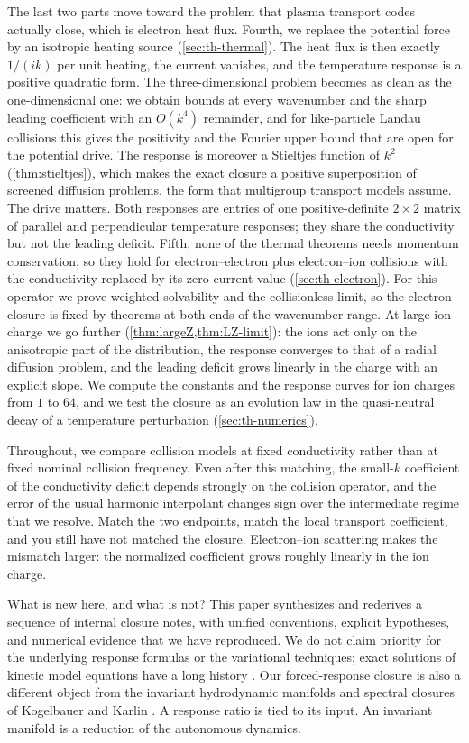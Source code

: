 \documentclass[11pt]{article}
\theoremstyle{definition}
\theoremstyle{remark}
\numberwithin{equation}{section}
\begin{document}
The last two parts move toward the problem that plasma transport codes
actually close, which is electron heat flux. Fourth, we replace the
potential force by an isotropic heating source (\cref{sec:th-thermal}).
The heat flux is then exactly $1/(ik)$ per unit heating, the current
vanishes, and the temperature response is a positive quadratic form. The
three-dimensional problem becomes as clean as the one-dimensional one:
we obtain bounds at every wavenumber and the sharp leading coefficient
with an $O(k^4)$ remainder, and for like-particle Landau collisions this
gives the positivity and the Fourier upper bound that are open for the
potential drive. The response is moreover a Stieltjes function of $k^2$
(\cref{thm:stieltjes}), which makes the exact closure a positive
superposition of screened diffusion problems, the form that multigroup
transport models assume. The drive
matters. Both responses are entries of one positive-definite $2\times2$
matrix of parallel and perpendicular temperature responses; they share
the conductivity but not the leading deficit. Fifth, none of the thermal
theorems needs momentum conservation, so they hold for electron--electron
plus electron--ion collisions with the conductivity replaced by its
zero-current value (\cref{sec:th-electron}). For this operator we prove
weighted solvability and the collisionless limit, so the electron closure
is fixed by theorems at both ends of the wavenumber range. At large ion
charge we go further (\cref{thm:largeZ,thm:LZ-limit}): the ions act only
on the anisotropic part of the distribution, the response converges to
that of a radial diffusion problem, and the leading deficit grows
linearly in the charge with an explicit slope. We compute the constants
and the response curves for ion charges from $1$ to $64$, and we test the
closure as an evolution law in the quasi-neutral decay of a temperature
perturbation (\cref{sec:th-numerics}).

Throughout, we compare collision models at fixed conductivity rather than
at fixed nominal collision frequency. Even after this matching, the
small-$k$ coefficient of the conductivity deficit depends strongly on the
collision operator, and the error of the usual harmonic interpolant
changes sign over the intermediate regime that we resolve. Match the two
endpoints, match the local transport coefficient, and you still have not
matched the closure. Electron--ion scattering makes the mismatch larger:
the normalized coefficient grows roughly linearly in the ion charge.

What is new here, and what is not? This paper synthesizes and rederives
a sequence of internal closure notes, with unified conventions, explicit
hypotheses, and numerical evidence that we have reproduced. We do not
claim priority for the underlying response formulas or the variational
techniques; exact solutions of kinetic model equations have a long
history \cite{BGK1954,Dougherty1964,Struchtrup1997}. Our forced-response
closure is also a different object from the invariant
hydrodynamic manifolds and spectral closures of Kogelbauer and Karlin
\cite{KogelbauerKarlin2024,KogelbauerKarlin2025}. A response ratio is
tied to its input. An invariant manifold is a reduction of the
autonomous dynamics.
\end{document}
